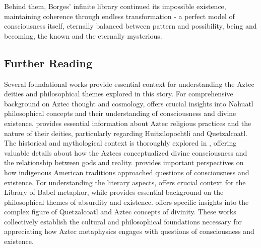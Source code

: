 Behind them, Borges' infinite library continued its impossible existence, maintaining coherence through endless transformation - a perfect model of consciousness itself, eternally balanced between pattern and possibility, being and becoming, the known and the eternally mysterious.

\subsection{Further Reading}

Several foundational works provide essential context for understanding the Aztec deities and philosophical themes explored in this story. For comprehensive background on Aztec thought and cosmology, \cite{leon-portilla1963aztec} offers crucial insights into Nahuatl philosophical concepts and their understanding of consciousness and divine existence. \cite{caso1958aztecs} provides essential information about Aztec religious practices and the nature of their deities, particularly regarding Huitzilopochtli and Quetzalcoatl. The historical and mythological context is thoroughly explored in \cite{sahagun1950florentine}, offering valuable details about how the Aztecs conceptualized divine consciousness and the relationship between gods and reality. \cite{brotherston1992book} provides important perspectives on how indigenous American traditions approached questions of consciousness and existence. For understanding the literary aspects, \cite{borges1964library} offers crucial context for the Library of Babel metaphor, while \cite{camus1955myth} provides essential background on the philosophical themes of absurdity and existence. \cite{carrasco1995quetzalcoatl} offers specific insights into the complex figure of Quetzalcoatl and Aztec concepts of divinity. These works collectively establish the cultural and philosophical foundations necessary for appreciating how Aztec metaphysics engages with questions of consciousness and existence.